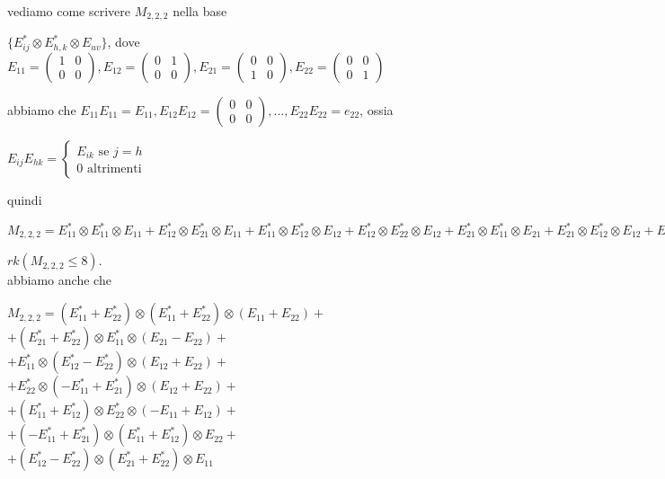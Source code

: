 \documentclass[a4paper,12pt]{article}
\theoremstyle{def}
\theoremstyle{prop}
\theoremstyle{esempio}
\theoremstyle{dimostrazione}
\theoremstyle{teo}
\theoremstyle{osservazione}
\begin{document}
vediamo come scrivere \(M_{2,2,2}\) nella base
\begin{center}
	\(\{E_{ij}^* \otimes E_{h,k}^* \otimes E_{uv}\}\), dove\\
	\(E_{11} = \begin{pmatrix}
		1 & 0 \\
		0 & 0
	\end{pmatrix},
	E_{12} = \begin{pmatrix}
		0 & 1 \\
		0 & 0
	\end{pmatrix},
	E_{21} = \begin{pmatrix}
		0 & 0 \\
		1 & 0
	\end{pmatrix},
	E_{22} = \begin{pmatrix}
		0 & 0 \\
		0 & 1
	\end{pmatrix}\)
\end{center}
abbiamo che \(E_{11}E_{11} = E_{11}, E_{12}E_{12} = \begin{pmatrix}
	0 & 0 \\
	0 & 0
\end{pmatrix}, ..., E_{22}E_{22} = e_{22}\), ossia
\begin{center}
	\(E_{ij} E_{hk} = \begin{cases}
		E_{ik} \text{ se } j = h \\
		0 \text{ altrimenti}
	\end{cases}\)
\end{center}
quindi
\begin{center}
	\(M_{2,2,2} = E_{11}^* \otimes E_{11}^* \otimes E_{11} + E_{12}^* \otimes E_{21}^* \otimes E_{11} + E_{11}^* \otimes E_{12}^* \otimes E_{12} + E_{12}^* \otimes E_{22}^* \otimes E_{12} + E_{21}^* \otimes E_{11}^* \otimes E_{21} + E_{21}^* \otimes E_{12}^* \otimes E_{12} + E_{22}^* \otimes E_{22}^* \otimes E_{22} + E_{22}^* \otimes E_{21}^* \otimes E_{21}\)\\
\end{center}
\(rk(M_{2,2,2} \leq 8)\).\\
abbiamo anche che
\begin{center}
	\(M_{2,2,2} = (E_{11}^* + E_{22}^*) \otimes (E_{11}^* + E_{22}^*) \otimes (E_{11} + E_{22}) + \)\\
	\(+ (E_{21}^* + E_{22}^*) \otimes E_{11}^* \otimes (E_{21} - E_{22}) + \)\\
	\(+ E_{11}^* \otimes (E_{12}^* - E_{22}^*) \otimes (E_{12} + E_{22}) + \)\\
	\(+ E_{22}^* \otimes (-E_{11}^* + E_{21}^*) \otimes (E_{12} + E_{22}) + \)\\
	\(+ (E_{11}^* + E_{12}^*) \otimes E_{22}^* \otimes (-E_{11} + E_{12}) + \)\\
	\(+ (-E_{11}^* + E_{21}^*) \otimes (E_{11}^* + E_{12}^*) \otimes E_{22} + \)\\
	\(+ (E_{12}^* - E_{22}^*) \otimes (E_{21}^* + E_{22}^*) \otimes E_{11}\)\\

\end{center}
\end{document}
